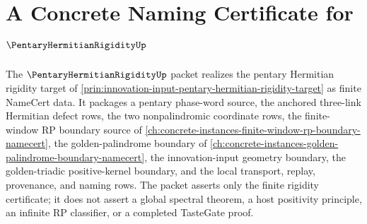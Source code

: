 \chapter{A Concrete Naming Certificate for $\PentaryHermitianRigidityUp$}
\label{ch:concrete-instances-pentary-hermitian-rigidity-namecert}

The $\PentaryHermitianRigidityUp$ packet realizes the pentary Hermitian rigidity target of \autoref{prin:innovation-input-pentary-hermitian-rigidity-target} as finite NameCert data. It packages a pentary phase-word source, the anchored three-link Hermitian defect rows, the two nonpalindromic coordinate rows, the finite-window RP boundary source of \autoref{ch:concrete-instances-finite-window-rp-boundary-namecert}, the golden-palindrome boundary of \autoref{ch:concrete-instances-golden-palindrome-boundary-namecert}, the innovation-input geometry boundary, the golden-triadic positive-kernel boundary, and the local transport, replay, provenance, and naming rows. The packet asserts only the finite rigidity certificate; it does not assert a global spectral theorem, a host positivity principle, an infinite RP classifier, or a completed TasteGate proof.

